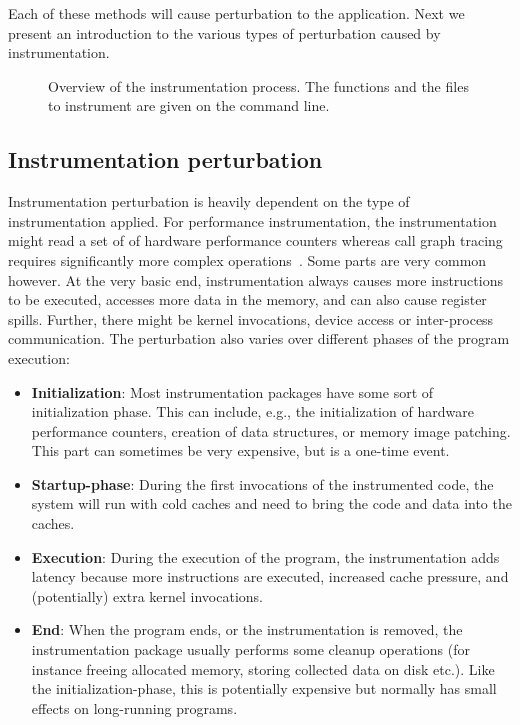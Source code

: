 Each of these methods will cause perturbation to the application. Next we
present an introduction to the various types of perturbation caused by
instrumentation.

\begin{figure*}[t]
  \begin{center}
  \end{center}
  \caption[The instrumentation process]{Overview of the instrumentation
    process. The functions and the files to instrument are given on the
    command line.}
  \label{fig:lopi:lipo_overview}
\end{figure*}

\subsection{Instrumentation perturbation}
Instrumentation perturbation is heavily dependent on the type of
instrumentation applied. For performance instrumentation, the instrumentation
might read a set of of hardware performance counters whereas call graph
tracing requires significantly more complex
operations~\cite{steignerwilke2003verstehen}. Some parts are very common
however. At the very basic end, instrumentation always causes more
instructions to be executed, accesses more data in the memory, and can also
cause register spills. Further, there might be kernel invocations, device
access or inter-process communication. The perturbation also varies over
different phases of the program execution:

\begin{itemize}
\item \textbf{Initialization}: Most instrumentation packages have some sort of
  initialization phase. This can include, e.g., the initialization of hardware
  performance counters, creation of data structures, or memory image patching.
  This part can sometimes be very expensive, but is a one-time event.
\item \textbf{Startup-phase}: During the first invocations of the instrumented
  code, the system will run with cold caches and need to bring the code and
  data into the caches.
\item \textbf{Execution}: During the execution of the program, the
  instrumentation adds latency because more instructions are executed,
  increased cache pressure, and (potentially) extra kernel invocations.
\item \textbf{End}: When the program ends, or the instrumentation is removed,
  the instrumentation package usually performs some cleanup operations (for
  instance freeing allocated memory, storing collected data on disk etc.).
  Like the initialization-phase, this is potentially expensive but normally
  has small effects on long-running programs.
\end{itemize}

